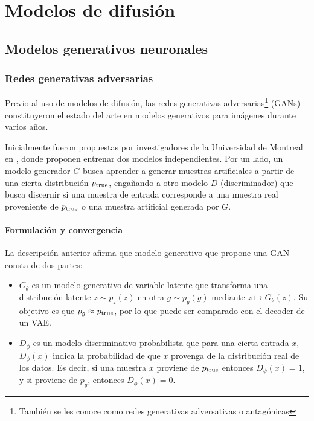 \chapter{Modelos de difusión}
\label{dm}

\section{Modelos generativos neuronales}
\label{dm/generative_models}


\subsection{Redes generativas adversarias}
\label{dm/generative_models/gans}

Previo al uso de modelos de difusión, las redes generativas adversarias\footnote{También se les conoce como redes generativas adversativas o antagónicas} (GANs) constituyeron el estado del arte en modelos generativos para imágenes durante varios años.

Inicialmente fueron propuestas por investigadores de la Universidad de Montreal en \cite{goodfellow2014generative}, donde proponen entrenar dos modelos independientes. Por un lado, un modelo generador $G$ busca aprender a generar muestras artificiales a partir de una cierta distribución $p_{\operatorname{true}}$, engañando a otro modelo $D$ (discriminador) que busca discernir si una muestra de entrada corresponde a una muestra real proveniente de $p_{\operatorname{true}}$ o una muestra artificial generada por $G$.

\subsubsection{Formulación y convergencia}

La descripción anterior afirma que modelo generativo que propone una GAN consta de dos partes:

\begin{itemize}
	\item $G_\theta$ es un modelo generativo de variable latente que transforma una distribución latente $z\sim p_z(z)$ en otra $g\sim p_g(g)$ mediante $z\mapsto G_\theta(z)$. Su objetivo es que $p_g\approx p_{\operatorname{true}}$, por lo que puede ser comparado con el decoder de un VAE.
	\item $D_\phi$ es un modelo discriminativo probabilista que para una cierta entrada $x$, $D_\phi(x)$ indica la probabilidad de que $x$ provenga de la distribución real de los datos. Es decir, si una muestra $x$ proviene de $p_{\operatorname{true}}$ entonces $D_\phi(x)=1$, y si proviene de $p_g$, entonces $D_\phi(x)=0$. \end{itemize}

